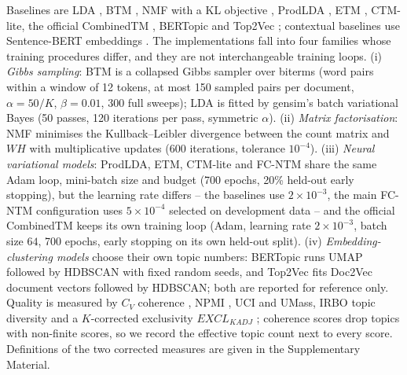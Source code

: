 \documentclass[Journal,letterpaper]{ascelike-new}
\newcommand{\fcntm}{FC-NTM}
\begin{document}
Baselines are LDA \cite{blei2003lda}, BTM \cite{yan2013btm}, NMF with a KL objective
\cite{lee2001nmf}, ProdLDA \cite{srivastava2017avitm}, ETM \cite{dieng2020etm}, CTM-lite, the
official CombinedTM \cite{bianchi2021ctm}, BERTopic \cite{grootendorst2022bertopic} and Top2Vec
\cite{angelov2020top2vec}; contextual baselines use Sentence-BERT embeddings
\cite{reimers2019sbert}. The implementations fall into four families whose training procedures
differ, and they are not interchangeable training loops. (i) \emph{Gibbs sampling}: BTM is a
collapsed Gibbs sampler over biterms (word pairs within a window of 12 tokens, at most 150 sampled
pairs per document, $\alpha=50/K$, $\beta=0.01$, 300 full sweeps); LDA is fitted by gensim's batch
variational Bayes (50 passes, 120 iterations per pass, symmetric $\alpha$). (ii) \emph{Matrix
factorisation}: NMF minimises the Kullback--Leibler divergence between the count matrix and $WH$
with multiplicative updates (600 iterations, tolerance $10^{-4}$). (iii) \emph{Neural variational
models}: ProdLDA, ETM, CTM-lite and \fcntm{} share the same Adam loop, mini-batch size and budget
(700 epochs, 20\% held-out early stopping), but the learning rate differs -- the baselines use
$2\times10^{-3}$, the main \fcntm{} configuration uses $5\times10^{-4}$ selected on development
data -- and the official CombinedTM keeps its own training loop (Adam, learning rate
$2\times10^{-3}$, batch size $64$, 700 epochs, early stopping on its own held-out split).
(iv) \emph{Embedding-clustering models} choose their own topic numbers: BERTopic runs UMAP
followed by HDBSCAN with fixed random seeds, and Top2Vec fits Doc2Vec document vectors followed by
HDBSCAN; both are reported for reference only. Quality is measured by $C_V$ coherence
\cite{roder2015coherence}, NPMI
\cite{bouma2009npmi,lau2014tea}, UCI and UMass, IRBO topic diversity \cite{webber2010rbo} and a
$K$-corrected exclusivity $EXCL_{KADJ}$ \cite{bischof2012exclusivity}; coherence scores drop
topics with non-finite scores, so we record the effective topic count next to every score.
Definitions of the two corrected measures are given in the Supplementary Material.
\end{document}
